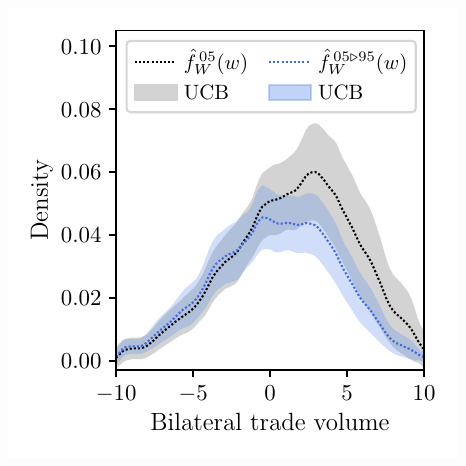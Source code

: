 \documentclass{article}
\begin{document}
\includegraphics[scale=0.5]{graphics/trade_plot_parametric_1995_2005.pdf}
\end{document}
